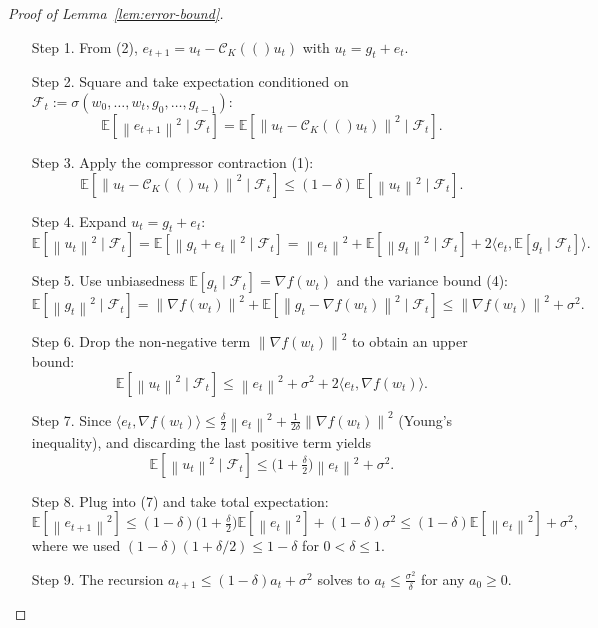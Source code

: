 \documentclass[11pt]{article}
\newcommand{\E}{\mathbb{E}}
\newcommand{\norm}[1]{\left\|#1\right\|}
\newcommand{\inner}[2]{\langle #1,#2\rangle}
\newcommand{\cK}[1]{\mathcal{C}_K(#1)}   %
\newcommand{\grad}{\nabla}
\begin{document}
\begin{proof}[Proof of Lemma~\ref{lem:error-bound}]
\begin{enumerate}
\item[Step 1.] From (2), $e_{t+1}=u_t-\cK(u_t)$ with $u_t=g_t+e_t$.
\item[Step 2.] Square and take expectation conditioned on $\mathcal{F}_t:=\sigma(w_0,\dots,w_t,g_0,\dots,g_{t-1})$:
\[
\E\!\left[\norm{e_{t+1}}^{2}\mid\mathcal{F}_t\right]
 =\E\!\left[\norm{u_t-\cK(u_t)}^{2}\mid\mathcal{F}_t\right].
\]
\item[Step 3.] Apply the compressor contraction (1):
\[
\E\!\left[\norm{u_t-\cK(u_t)}^{2}\mid\mathcal{F}_t\right]
 \le (1-\delta)\,\E\!\left[\norm{u_t}^{2}\mid\mathcal{F}_t\right].
\tag{7}
\]
\item[Step 4.] Expand $u_t=g_t+e_t$:
\[
\E\!\left[\norm{u_t}^{2}\mid\mathcal{F}_t\right]
 =\E\!\left[\norm{g_t+e_t}^{2}\mid\mathcal{F}_t\right]
 =\norm{e_t}^{2}+ \E\!\left[\norm{g_t}^{2}\mid\mathcal{F}_t\right]
      +2\inner{e_t}{\E[g_t\mid\mathcal{F}_t]} .
\]
\item[Step 5.] Use unbiasedness $\E[g_t\mid\mathcal{F}_t]=\grad f(w_t)$ and the variance bound (4):
\[
\E\!\left[\norm{g_t}^{2}\mid\mathcal{F}_t\right]
 =\norm{\grad f(w_t)}^{2}+\E\!\left[\norm{g_t-\grad f(w_t)}^{2}\mid\mathcal{F}_t\right]
 \le \norm{\grad f(w_t)}^{2}+\sigma^{2}.
\]
\item[Step 6.] Drop the non‑negative term $\norm{\grad f(w_t)}^{2}$ to obtain an upper bound:
\[
\E\!\left[\norm{u_t}^{2}\mid\mathcal{F}_t\right]\le \norm{e_t}^{2}+\sigma^{2}+2\inner{e_t}{\grad f(w_t)}.
\]
\item[Step 7.] Since $\inner{e_t}{\grad f(w_t)}\le \frac{\delta}{2}\norm{e_t}^{2}+\frac{1}{2\delta}\norm{\grad f(w_t)}^{2}$ (Young’s inequality), and discarding the last positive term yields
\[
\E\!\left[\norm{u_t}^{2}\mid\mathcal{F}_t\right]\le \bigl(1+\tfrac{\delta}{2}\bigr)\norm{e_t}^{2}+\sigma^{2}.
\]
\item[Step 8.] Plug into (7) and take total expectation:
\[
\E\!\left[\norm{e_{t+1}}^{2}\right]\le (1-\delta)\bigl(1+\tfrac{\delta}{2}\bigr)\E\!\left[\norm{e_t}^{2}\right]+(1-\delta)\sigma^{2}
\le (1-\delta)\E\!\left[\norm{e_t}^{2}\right]+\sigma^{2},
\]
where we used $(1-\delta)(1+\delta/2)\le 1-\delta$ for $0<\delta\le1$.
\item[Step 9.] The recursion $a_{t+1}\le(1-\delta)a_t+\sigma^{2}$ solves to $a_t\le\frac{\sigma^{2}}{\delta}$ for any $a_0\ge0$.
\end{enumerate}
\end{proof}
\end{document}
